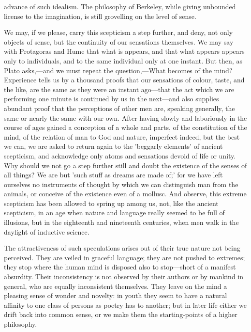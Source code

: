 \documentclass[11pt,letter]{article}
\begin{document}
advance of such idealism. The philosophy of Berkeley, while giving unbounded license to the imagination, is still grovelling on the level of sense.

\par  We may, if we please, carry this scepticism a step further, and deny, not only objects of sense, but the continuity of our sensations themselves. We may say with Protagoras and Hume that what is appears, and that what appears appears only to individuals, and to the same individual only at one instant. But then, as Plato asks,—and we must repeat the question,—What becomes of the mind? Experience tells us by a thousand proofs that our sensations of colour, taste, and the like, are the same as they were an instant ago—that the act which we are performing one minute is continued by us in the next—and also supplies abundant proof that the perceptions of other men are, speaking generally, the same or nearly the same with our own. After having slowly and laboriously in the course of ages gained a conception of a whole and parts, of the constitution of the mind, of the relation of man to God and nature, imperfect indeed, but the best we can, we are asked to return again to the 'beggarly elements' of ancient scepticism, and acknowledge only atoms and sensations devoid of life or unity. Why should we not go a step further still and doubt the existence of the senses of all things? We are but 'such stuff as dreams are made of;' for we have left ourselves no instruments of thought by which we can distinguish man from the animals, or conceive of the existence even of a mollusc. And observe, this extreme scepticism has been allowed to spring up among us, not, like the ancient scepticism, in an age when nature and language really seemed to be full of illusions, but in the eighteenth and nineteenth centuries, when men walk in the daylight of inductive science.

\par  The attractiveness of such speculations arises out of their true nature not being perceived. They are veiled in graceful language; they are not pushed to extremes; they stop where the human mind is disposed also to stop—short of a manifest absurdity. Their inconsistency is not observed by their authors or by mankind in general, who are equally inconsistent themselves. They leave on the mind a pleasing sense of wonder and novelty: in youth they seem to have a natural affinity to one class of persons as poetry has to another; but in later life either we drift back into common sense, or we make them the starting-points of a higher philosophy.
\end{document}
